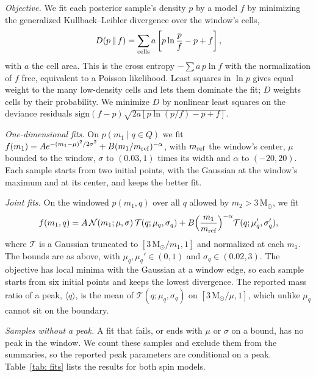 \documentclass[%
 onecolumn,
 amsmath,amssymb,
 aps,
 prl,
 nofootinbib,nobibnotes,
]{revtex4-2}
\newcommand{\Msun}{\ensuremath{\mathrm{M}_{\odot}}}
\begin{document}
\textit{Objective.} We fit each posterior sample's density $p$ by a model $f$ by minimizing the generalized Kullback--Leibler divergence over the window's cells,
\begin{equation}
    D(p \,\|\, f) = \sum_{\rm cells} a \left[p \ln\frac{p}{f} - p + f\right],
\end{equation}
with $a$ the cell area. This is the cross entropy $-\sum a\, p \ln f$ with the normalization of $f$ free, equivalent to a Poisson likelihood. Least squares in $\ln p$ gives equal weight to the many low-density cells and lets them dominate the fit; $D$ weights cells by their probability. We minimize $D$ by nonlinear least squares on the deviance residuals $\mathrm{sign}(f - p)\sqrt{2a[p\ln(p/f) - p + f]}$.

\textit{One-dimensional fits.} On $p(m_1 \mid q \in Q)$ we fit $f(m_1) = A e^{-(m_1 - \mu)^2/2\sigma^2} + B(m_1/m_{\rm ref})^{-\alpha}$, with $m_{\rm ref}$ the window's center, $\mu$ bounded to the window, $\sigma$ to $(0.03, 1)$ times its width and $\alpha$ to $(-20, 20)$. Each sample starts from two initial points, with the Gaussian at the window's maximum and at its center, and keeps the better fit.

\textit{Joint fits.} On the windowed $p(m_1, q)$ over all $q$ allowed by $m_2 > 3\,\Msun$, we fit
\begin{equation}
    f(m_1, q) = A\, \mathcal{N}(m_1; \mu, \sigma)\, \mathcal{T}(q; \mu_q, \sigma_q) + B \Big(\frac{m_1}{m_{\rm ref}}\Big)^{-\alpha} \mathcal{T}(q; \mu_q', \sigma_q'),
\end{equation}
where $\mathcal{T}$ is a Gaussian truncated to $[3\,\Msun/m_1, 1]$ and normalized at each $m_1$. The bounds are as above, with $\mu_q, \mu_q' \in (0, 1)$ and $\sigma_q \in (0.02, 3)$. The objective has local minima with the Gaussian at a window edge, so each sample starts from six initial points and keeps the lowest divergence. The reported mass ratio of a peak, $\langle q \rangle$, is the mean of $\mathcal{T}(q; \mu_q, \sigma_q)$ on $[3\,\Msun/\mu, 1]$, which unlike $\mu_q$ cannot sit on the boundary.

\textit{Samples without a peak.} A fit that fails, or ends with $\mu$ or $\sigma$ on a bound, has no peak in the window. We count these samples and exclude them from the summaries, so the reported peak parameters are conditional on a peak. Table~\ref{tab: fits} lists the results for both spin models.
\end{document}
